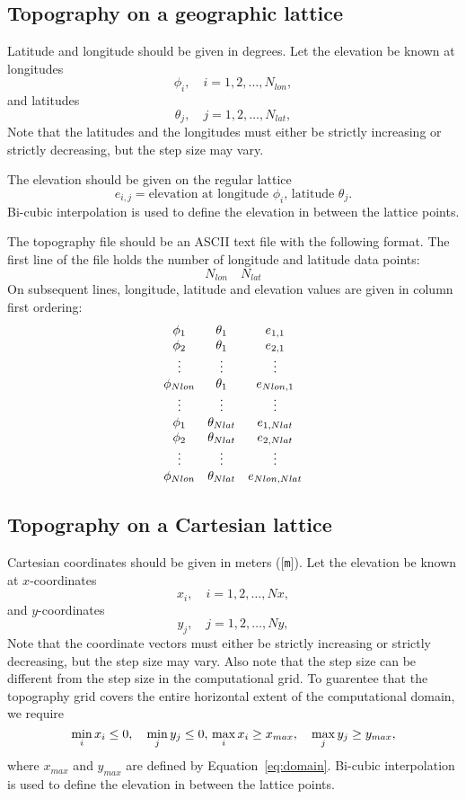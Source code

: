 \documentclass[11pt]{report}
\begin{document}
\subsection{Topography on a geographic lattice}
Latitude and longitude should be given in degrees. Let the elevation be known at longitudes
\[
\phi_i,\quad i=1,2,\ldots,N_{lon},
\]
and latitudes
\[
\theta_j,\quad j=1,2,\ldots,N_{lat},
\]
Note that the latitudes and the longitudes must either be strictly increasing or strictly
decreasing, but the step size may vary.

The elevation should be given on the regular lattice
\[
e_{i,j} = \mbox{elevation at longitude $\phi_i$, latitude $\theta_j$.}
\]
Bi-cubic interpolation is used to define the elevation in between the lattice points.

The topography file should be an ASCII text file with the following format. The first line of the
file holds the number of longitude and latitude data points:
\[
N_{lon}\quad N_{lat}
\]
On subsequent lines, longitude, latitude and elevation values are given in column first ordering:
\[
\begin{array}{c c c}
\phi_1 & \theta_1& e_{1,1}\\
\phi_2& \theta_1& e_{2,1}\\
\vdots&\vdots&\vdots\\
\phi_{Nlon}& \theta_1& e_{Nlon,1}\\
\vdots&\vdots&\vdots\\
\phi_1 & \theta_{Nlat}& e_{1,Nlat}\\
\phi_2& \theta_{Nlat}& e_{2,Nlat}\\
\vdots&\vdots&\vdots\\
\phi_{Nlon}& \theta_{Nlat}& e_{Nlon,Nlat}
\end{array}
\]

\subsection{Topography on a Cartesian lattice}
Cartesian coordinates should be given in meters ([{\tt m}]). Let the elevation be known at $x$-coordinates
\[
x_i,\quad i=1,2,\ldots,Nx,
\]
and $y$-coordinates
\[
y_j,\quad j=1,2,\ldots,Ny,
\]
Note that the coordinate vectors must either be strictly increasing or strictly
decreasing, but the step size may vary. Also note that the step size can be different from the step
size in the computational grid. To guarentee that the topography grid covers the entire horizontal
extent of the computational domain, we require
\[
\min_i x_i \leq 0,\quad \min_j y_j \leq 0,\\
\max_i x_i \geq x_{max},\quad \max_j y_j \geq y_{max},
\] 
where $x_{max}$ and $y_{max}$ are defined by Equation~\eqref{eq:domain}. Bi-cubic interpolation is
used to define the elevation in between the lattice points.
\end{document}
